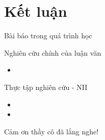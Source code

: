 
\section*{Kết luận}


\begin{frame}{Bài báo trong quá trình học}
    \begin{block}{Nghiên cứu chính của luận văn}
        \begin{itemize}
            \item {}
        \end{itemize}
    \end{block}
    \begin{block}{Thực tập nghiên cứu - NII}
        \begin{itemize}
            \item {}
            \item {}
        \end{itemize}
    \end{block}
\end{frame}

\begin{frame}{}
    \centering \Huge Cảm ơn thầy cô đã lắng nghe!
\end{frame}